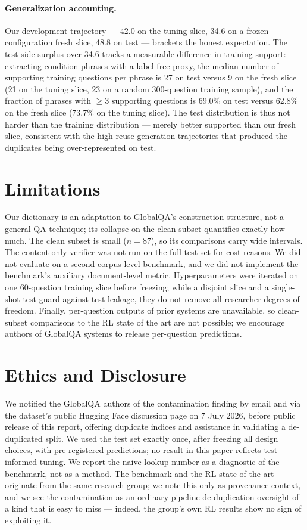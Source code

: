 \documentclass[11pt]{article}
\begin{document}
\paragraph{Generalization accounting.} Our development trajectory --- 42.0 on the tuning slice, 34.6 on a frozen-configuration fresh slice, 48.8 on test --- brackets the honest expectation. The test-side surplus over 34.6 tracks a measurable difference in training support: extracting condition phrases with a label-free proxy, the median number of supporting training questions per phrase is 27 on test versus 9 on the fresh slice (21 on the tuning slice, 23 on a random 300-question training sample), and the fraction of phrases with $\geq 3$ supporting questions is 69.0\% on test versus 62.8\% on the fresh slice (73.7\% on the tuning slice). The test distribution is thus not harder than the training distribution --- merely better supported than our fresh slice, consistent with the high-reuse generation trajectories that produced the duplicates being over-represented on test.

\section{Limitations}
\label{sec:limitations}

Our dictionary is an adaptation to GlobalQA's construction structure, not a general QA technique; its collapse on the clean subset quantifies exactly how much. The clean subset is small ($n{=}87$), so its comparisons carry wide intervals. The content-only verifier was not run on the full test set for cost reasons. We did not evaluate on a second corpus-level benchmark, and we did not implement the benchmark's auxiliary document-level metric. Hyperparameters were iterated on one 60-question training slice before freezing; while a disjoint slice and a single-shot test guard against test leakage, they do not remove all researcher degrees of freedom. Finally, per-question outputs of prior systems are unavailable, so clean-subset comparisons to the RL state of the art are not possible; we encourage authors of GlobalQA systems to release per-question predictions.

\section{Ethics and Disclosure}

We notified the GlobalQA authors of the contamination finding by email and via the dataset's public Hugging Face discussion page on 7 July 2026, before public release of this report, offering duplicate indices and assistance in validating a de-duplicated split. We used the test set exactly once, after freezing all design choices, with pre-registered predictions; no result in this paper reflects test-informed tuning. We report the naive lookup number as a diagnostic of the benchmark, not as a method. The benchmark and the RL state of the art originate from the same research group; we note this only as provenance context, and we see the contamination as an ordinary pipeline de-duplication oversight of a kind that is easy to miss --- indeed, the group's own RL results show no sign of exploiting it.
\end{document}
